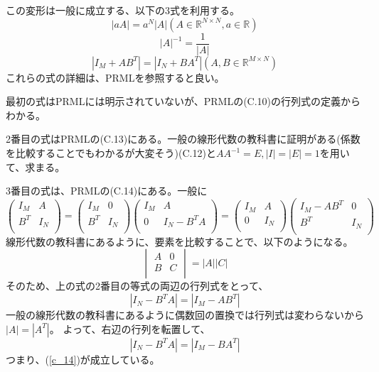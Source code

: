 \documentclass{jsarticle}
\begin{document}
この変形は一般に成立する、以下の3式を利用する。
\begin{equation}
|aA| = a^N |A| (A \in \mathbb{R}^{N \times N}, a \in \mathbb{R})
\end{equation}
\begin{equation}
|A|^{-1} = \frac{1}{|A|}
\end{equation}
\begin{equation}
\label{c_14}
|I_M + AB^T| = |I_N + BA^T| (A,B \in \mathbb{R}^{M \times N})
\end{equation}
これらの式の詳細は、PRMLを参照すると良い。

最初の式はPRMLには明示されていないが、PRMLの(C.10)の行列式の定義からわかる。

2番目の式はPRMLの(C.13)にある。一般の線形代数の教科書に証明がある(係数を比較することでもわかるが大変そう)(C.12)と$AA^{-1}=E, |I|=|E|=1$を用いて、求まる。

3番目の式は、PRMLの(C.14)にある。一般に
\begin{equation}
\begin{pmatrix}
I_M & A\\
B^T & I_N\\
\end{pmatrix} =
\begin{pmatrix}
I_M & 0\\
B^T & I_N\\
\end{pmatrix}
\begin{pmatrix}
I_M & A\\
0 & I_N-B^T A\\
\end{pmatrix}=
\begin{pmatrix}
I_M & A\\
0 & I_N\\
\end{pmatrix}
\begin{pmatrix}
I_M - AB^T & 0\\
B^T & I_N\\
\end{pmatrix}
\end{equation}
線形代数の教科書にあるように、要素を比較することで、以下のようになる。
\begin{equation}
\begin{vmatrix}
A & 0\\
B & C\\
\end{vmatrix} = 
|A||C|
\end{equation}
そのため、上の式の2番目の等式の両辺の行列式をとって、
\begin{equation}
|I_N-B^T A|=|I_M - AB^T|
\end{equation}
一般の線形代数の教科書にあるように偶数回の置換では行列式は変わらないから$|A|=|A^T|$。
よって、右辺の行列を転置して、
\begin{equation}
|I_N-B^T A|=|I_M - BA^T|
\end{equation}
つまり、(\ref{c_14})が成立している。
\end{document}
